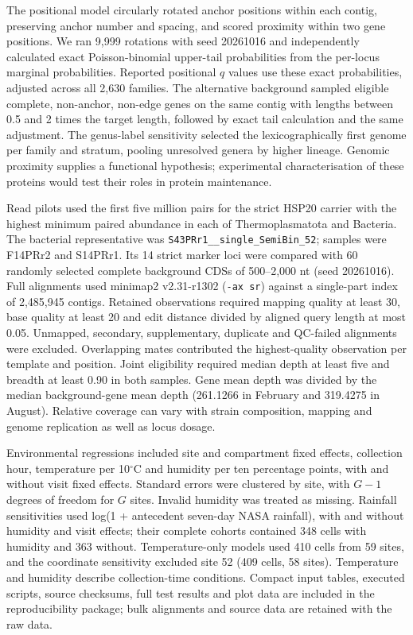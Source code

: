 The positional model circularly rotated anchor positions within each contig, preserving anchor number and spacing, and scored proximity within two gene positions. We ran 9{,}999 rotations with seed 20261016 and independently calculated exact Poisson-binomial upper-tail probabilities from the per-locus marginal probabilities. Reported positional $q$ values use these exact probabilities, adjusted across all 2{,}630 families. The alternative background sampled eligible complete, non-anchor, non-edge genes on the same contig with lengths between 0.5 and 2 times the target length, followed by exact tail calculation and the same adjustment. The genus-label sensitivity selected the lexicographically first genome per family and stratum, pooling unresolved genera by higher lineage. Genomic proximity supplies a functional hypothesis; experimental characterisation of these proteins would test their roles in protein maintenance.

Read pilots used the first five million pairs for the strict HSP20 carrier with the highest minimum paired abundance in each of Thermoplasmatota and Bacteria. The bacterial representative was \texttt{S43PRr1\_\_single\_SemiBin\_52}; samples were F14PRr2 and S14PRr1. Its 14 strict marker loci were compared with 60 randomly selected complete background CDSs of 500--2{,}000 nt (seed 20261016). Full alignments used minimap2 v2.31-r1302 (\texttt{-ax sr}) against a single-part index of 2{,}485{,}945 contigs. Retained observations required mapping quality at least 30, base quality at least 20 and edit distance divided by aligned query length at most 0.05. Unmapped, secondary, supplementary, duplicate and QC-failed alignments were excluded. Overlapping mates contributed the highest-quality observation per template and position. Joint eligibility required median depth at least five and breadth at least 0.90 in both samples. Gene mean depth was divided by the median background-gene mean depth (261.1266 in February and 319.4275 in August). Relative coverage can vary with strain composition, mapping and genome replication as well as locus dosage.

Environmental regressions included site and compartment fixed effects, collection hour, temperature per 10$^{\circ}$C and humidity per ten percentage points, with and without visit fixed effects. Standard errors were clustered by site, with $G-1$ degrees of freedom for $G$ sites. Invalid humidity was treated as missing. Rainfall sensitivities used log(1 + antecedent seven-day NASA rainfall), with and without humidity and visit effects; their complete cohorts contained 348 cells with humidity and 363 without. Temperature-only models used 410 cells from 59 sites, and the coordinate sensitivity excluded site 52 (409 cells, 58 sites). Temperature and humidity describe collection-time conditions. Compact input tables, executed scripts, source checksums, full test results and plot data are included in the reproducibility package; bulk alignments and source data are retained with the raw data.

